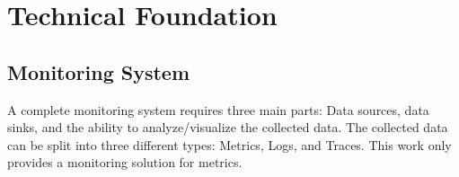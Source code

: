 \chapter{Technical Foundation}






\section{Monitoring System}
A complete monitoring system requires three main parts: Data sources, data sinks, and the ability
to analyze/visualize the collected data.
The collected data can be split into three different types: Metrics, Logs, and Traces.
This work only provides a monitoring solution for metrics.

